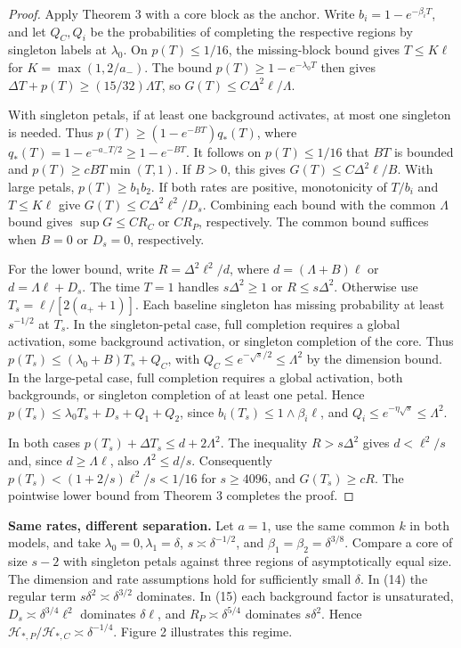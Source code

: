 \documentclass[11pt]{article}
\begin{document}
\begin{proof}
Apply Theorem 3 with a core block as the anchor. Write \(b_i=1-e^{-\beta_iT}\), and let \(Q_C,Q_i\) be the probabilities of completing the respective regions by singleton labels at \(\lambda_0\). On \(p(T)\le1/16\), the missing-block bound gives \(T\le K\ell\) for \(K=\max(1,2/a_-)\). The bound \(p(T)\ge1-e^{-\lambda_0T}\) then gives \(\Delta T+p(T)\ge(15/32)\Lambda T\), so \(G(T)\le C\Delta^2\ell/\Lambda\).

With singleton petals, if at least one background activates, at most one singleton is needed. Thus \(p(T)\ge(1-e^{-BT})q_*(T)\), where \(q_*(T)=1-e^{-a_-T/2}\ge1-e^{-BT}\). It follows on \(p(T)\le1/16\) that \(BT\) is bounded and \(p(T)\ge cBT\min(T,1)\). If \(B>0\), this gives \(G(T)\le C\Delta^2\ell/B\). With large petals, \(p(T)\ge b_1b_2\). If both rates are positive, monotonicity of \(T/b_i\) and \(T\le K\ell\) give \(G(T)\le C\Delta^2\ell^2/D_s\). Combining each bound with the common \(\Lambda\) bound gives \(\sup G\le CR_C\) or \(CR_P\), respectively. The common bound suffices when \(B=0\) or \(D_s=0\), respectively.

For the lower bound, write \(R=\Delta^2\ell^2/d\), where \(d=(\Lambda+B)\ell\) or \(d=\Lambda\ell+D_s\). The time \(T=1\) handles \(s\Delta^2\ge1\) or \(R\le s\Delta^2\). Otherwise use \(T_s=\ell/[2(a_++1)]\). Each baseline singleton has missing probability at least \(s^{-1/2}\) at \(T_s\). In the singleton-petal case, full completion requires a global activation, some background activation, or singleton completion of the core. Thus \(p(T_s)\le(\lambda_0+B)T_s+Q_C\), with \(Q_C\le e^{-\sqrt{s}/2}\le\Lambda^2\) by the dimension bound. In the large-petal case, full completion requires a global activation, both backgrounds, or singleton completion of at least one petal. Hence \(p(T_s)\le\lambda_0T_s+D_s+Q_1+Q_2\), since \(b_i(T_s)\le1\wedge\beta_i\ell\), and \(Q_i\le e^{-\eta\sqrt{s}}\le\Lambda^2\).

In both cases \(p(T_s)+\Delta T_s\le d+2\Lambda^2\). The inequality \(R>s\Delta^2\) gives \(d<\ell^2/s\) and, since \(d\ge\Lambda\ell\), also \(\Lambda^2\le d/s\). Consequently \(p(T_s)<(1+2/s)\ell^2/s<1/16\) for \(s\ge4096\), and \(G(T_s)\ge cR\). The pointwise lower bound from Theorem 3 completes the proof.
\end{proof}

\textbf{Same rates, different separation.} Let \(a=1\), use the same common \(k\) in both models, and take \(\lambda_0=0,\lambda_1=\delta\), \(s\asymp\delta^{-1/2}\), and \(\beta_1=\beta_2=\delta^{3/8}\). Compare a core of size \(s-2\) with singleton petals against three regions of asymptotically equal size. The dimension and rate assumptions hold for sufficiently small \(\delta\). In (14) the regular term \(s\delta^2\asymp\delta^{3/2}\) dominates. In (15) each background factor is unsaturated, \(D_s\asymp\delta^{3/4}\ell^2\) dominates \(\delta\ell\), and \(R_P\asymp\delta^{5/4}\) dominates \(s\delta^2\). Hence \(\mathcal H_{*,P}/\mathcal H_{*,C}\asymp\delta^{-1/4}\). Figure 2 illustrates this regime.
\end{document}
